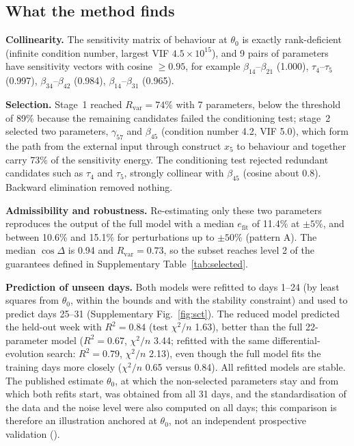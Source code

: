 \subsection*{What the method finds}
\textbf{Collinearity.} The sensitivity matrix of behaviour at $\theta_0$ is exactly rank-deficient (infinite condition number, largest VIF $4.5\times10^{15}$), and 9 pairs of parameters have sensitivity vectors with cosine $\ge0.95$, for example $\beta_{14}$--$\beta_{21}$ (1.000), $\tau_{4}$--$\tau_{5}$ (0.997), $\beta_{34}$--$\beta_{42}$ (0.984), $\beta_{14}$--$\beta_{31}$ (0.965).

\textbf{Selection.} Stage~1 reached $R_{\mathrm{var}}=74\%$ with 7 parameters, below the threshold of 89\% because the remaining candidates failed the conditioning test; stage~2 selected two parameters, $\gamma_{57}$ and $\beta_{45}$ (condition number 4.2, VIF 5.0), which form the path from the external input through construct $x_5$ to behaviour and together carry 73\% of the sensitivity energy. The conditioning test rejected redundant candidates such as $\tau_4$ and $\tau_5$, strongly collinear with $\beta_{45}$ (cosine about 0.8). Backward elimination removed nothing.

\textbf{Admissibility and robustness.} Re-estimating only these two parameters reproduces the output of the full model with a median $e_{\mathrm{fit}}$ of 11.4\% at $\pm5\%$, and between 10.6\% and 15.1\% for perturbations up to $\pm50\%$ (pattern A). The median $\cos\Delta$ is 0.94 and $R_{\mathrm{var}}=0.73$, so the subset reaches level 2 of the guarantees defined in Supplementary Table~\ref{tab:selected}.

\textbf{Prediction of unseen days.} Both models were refitted to days 1--24 (by least squares from $\theta_0$, within the bounds and with the stability constraint) and used to predict days 25--31 (Supplementary Fig.~\ref{fig:sct}). The reduced model predicted the held-out week with $R^2=0.84$ (test $\chi^2/n$ 1.63), better than the full 22-parameter model ($R^2=0.67$, $\chi^2/n$ 3.44; refitted with the same differential-evolution search: $R^2=0.79$, $\chi^2/n$ 2.13), even though the full model fits the training days more closely ($\chi^2/n$ 0.65 versus 0.84). All refitted models are stable. The published estimate $\theta_0$, at which the non-selected parameters stay and from which both refits start, was obtained from all 31 days, and the standardisation of the data and the noise level were also computed on all days; this comparison is therefore an illustration anchored at $\theta_0$, not an independent prospective validation ().


